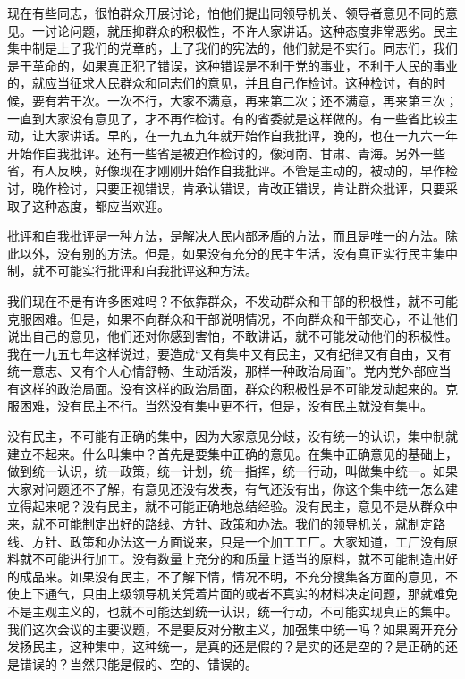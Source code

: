现在有些同志，很怕群众开展讨论，怕他们提出同领导机关、领导者意见不同的意见。一讨论问题，就压抑群众的积极性，不许人家讲话。这种态度非常恶劣。民主集中制是上了我们的党章的，上了我们的宪法的，他们就是不实行。同志们，我们是干革命的，如果真正犯了错误，这种错误是不利于党的事业，不利于人民的事业的，就应当征求人民群众和同志们的意见，并且自己作检讨。这种检讨，有的时候，要有若干次。一次不行，大家不满意，再来第二次；还不满意，再来第三次；一直到大家没有意见了，才不再作检讨。有的省委就是这样做的。有一些省比较主动，让大家讲话。早的，在一九五九年就开始作自我批评，晚的，也在一九六一年开始作自我批评。还有一些省是被迫作检讨的，像河南、甘肃、青海。另外一些省，有人反映，好像现在才刚刚开始作自我批评。不管是主动的，被动的，早作检讨，晚作检讨，只要正视错误，肯承认错误，肯改正错误，肯让群众批评，只要采取了这种态度，都应当欢迎。

批评和自我批评是一种方法，是解决人民内部矛盾的方法，而且是唯一的方法。除此以外，没有别的方法。但是，如果没有充分的民主生活，没有真正实行民主集中制，就不可能实行批评和自我批评这种方法。

我们现在不是有许多困难吗？不依靠群众，不发动群众和干部的积极性，就不可能克服困难。但是，如果不向群众和干部说明情况，不向群众和干部交心，不让他们说出自己的意见，他们还对你感到害怕，不敢讲话，就不可能发动他们的积极性。我在一九五七年这样说过，要造成“又有集中又有民主，又有纪律又有自由，又有统一意志、又有个人心情舒畅、生动活泼，那样一种政治局面”。党内党外部应当有这样的政治局面。没有这样的政治局面，群众的积极性是不可能发动起来的。克服困难，没有民主不行。当然没有集中更不行，但是，没有民主就没有集中。

没有民主，不可能有正确的集中，因为大家意见分歧，没有统一的认识，集中制就建立不起来。什么叫集中？首先是要集中正确的意见。在集中正确意见的基础上，做到统一认识，统一政策，统一计划，统一指挥，统一行动，叫做集中统一。如果大家对问题还不了解，有意见还没有发表，有气还没有出，你这个集中统一怎么建立得起来呢？没有民主，就不可能正确地总结经验。没有民主，意见不是从群众中来，就不可能制定出好的路线、方针、政策和办法。我们的领导机关，就制定路线、方针、政策和办法这一方面说来，只是一个加工工厂。大家知道，工厂没有原料就不可能进行加工。没有数量上充分的和质量上适当的原料，就不可能制造出好的成品来。如果没有民主，不了解下情，情况不明，不充分搜集各方面的意见，不使上下通气，只由上级领导机关凭着片面的或者不真实的材料决定问题，那就难免不是主观主义的，也就不可能达到统一认识，统一行动，不可能实现真正的集中。我们这次会议的主要议题，不是要反对分散主义，加强集中统一吗？如果离开充分发扬民主，这种集中，这种统一，是真的还是假的？是实的还是空的？是正确的还是错误的？当然只能是假的、空的、错误的。

